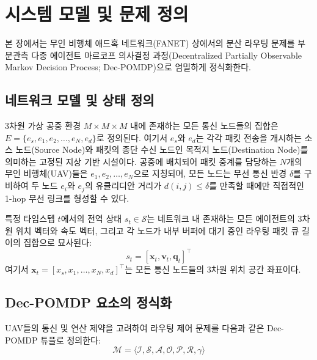 \section{시스템 모델 및 문제 정의}
\label{sec:문제정의}

본 장에서는 무인 비행체 애드혹 네트워크(FANET) 상에서의 분산 라우팅 문제를 부분관측 다중 에이전트 마르코프 의사결정 과정(Decentralized Partially Observable Markov Decision Process; Dec-POMDP)으로 엄밀하게 정식화한다.

\subsection{네트워크 모델 및 상태 정의}
3차원 가상 공중 환경 $M \times M \times M$ 내에 존재하는 모든 통신 노드들의 집합은 $E = \{e_s, e_1, e_2, \dots, e_N, e_d\}$로 정의된다. 여기서 $e_s$와 $e_d$는 각각 패킷 전송을 개시하는 소스 노드(Source Node)와 패킷의 종단 수신 노드인 목적지 노드(Destination Node)를 의미하는 고정된 지상 기반 시설이다. 공중에 배치되어 패킷 중계를 담당하는 $N$개의 무인 비행체(UAV)들은 $e_1, e_2, \dots, e_N$으로 지칭되며, 모든 노드는 무선 통신 반경 $\delta$를 구비하여 두 노드 $e_i$와 $e_j$의 유클리디안 거리가 $d(i,j) \le \delta$를 만족할 때에만 직접적인 1-hop 무선 링크를 형성할 수 있다.

특정 타임스텝 $t$에서의 전역 상태 $s_t \in \mathcal{S}$는 네트워크 내 존재하는 모든 에이전트의 3차원 위치 벡터와 속도 벡터, 그리고 각 노드가 내부 버퍼에 대기 중인 라우팅 패킷 큐 길이의 집합으로 묘사된다:
\[
s_t = [ \mathbf{x}_t, \mathbf{v}_t, \mathbf{q}_t ]^\top
\]
여기서 $\mathbf{x}_t = [x_s, x_1, \dots, x_N, x_d]^\top$는 모든 통신 노드들의 3차원 위치 공간 좌표이다.

\subsection{Dec-POMDP 요소의 정식화}
UAV들의 통신 및 연산 제약을 고려하여 라우팅 제어 문제를 다음과 같은 Dec-POMDP 튜플로 정의한다:
\[
\mathcal{M} = \langle \mathcal{I}, \mathcal{S}, \mathcal{A}, \mathcal{O}, \mathcal{P}, \mathcal{R}, \gamma \rangle
\]

